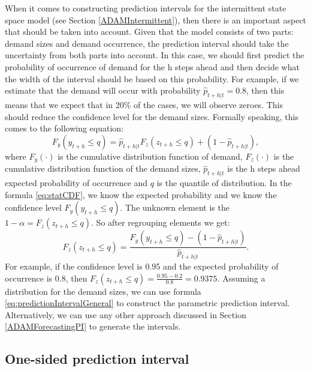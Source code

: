 \documentclass[
]{book}
\theoremstyle{definition}
\theoremstyle{definition}
\theoremstyle{definition}
\theoremstyle{definition}
\theoremstyle{remark}
\begin{document}
When it comes to constructing prediction intervals for the intermittent state space model (see Section \ref{ADAMIntermittent}), then there is an important aspect that should be taken into account. Given that the model consists of two parts: demand sizes and demand occurrence, the prediction interval should take the uncertainty from both parts into account. In this case, we should first predict the probability of occurrence of demand for the h steps ahead and then decide what the width of the interval should be based on this probability. For example, if we estimate that the demand will occur with probability \(\hat{p}_{t+h|t} = 0.8\), then this means that we expect that in 20\% of the cases, we will observe zeroes. This should reduce the confidence level for the demand sizes. Formally speaking, this comes to the following equation:
\begin{equation}
    F_y(y_{t+h} \leq q) = \hat{p}_{t+h|t} F_z(z_{t+h} \leq q) +(1 -\hat{p}_{t+h|t}),
    \label{eq:statCDF}
\end{equation}
where \(F_y(\cdot)\) is the cumulative distribution function of demand, \(F_z(\cdot)\) is the cumulative distribution function of the demand sizes, \(\hat{p}_{t+h|t}\) is the h steps ahead expected probability of occurrence and \(q\) is the quantile of distribution. In the formula \eqref{eq:statCDF}, we know the expected probability and we know the confidence level \(F_y(y_{t+h} \leq q)\). The unknown element is the \(1-\alpha = F_z(z_{t+h} \leq q)\). So after regrouping elements we get:
\begin{equation}
    F_z(z_{t+h} \leq q) = \frac{F_y(y_{t+h} \leq q) -(1 -\hat{p}_{t+h|t})}{\hat{p}_{t+h|t}}.
    \label{eq:statCDFDemandSizes}
\end{equation}
For example, if the confidence level is 0.95 and the expected probability of occurrence is 0.8, then \(F_z(z_{t+h} \leq q) = \frac{0.95 -0.2}{0.8} = 0.9375\). Assuming a distribution for the demand sizes, we can use formula \eqref{eq:predictionIntervalGeneral} to construct the parametric prediction interval. Alternatively, we can use any other approach discussed in Section \ref{ADAMForecastingPI} to generate the intervals.

\hypertarget{forecastingADAMOtherOneSided}{%
\subsection{One-sided prediction interval}\label{forecastingADAMOtherOneSided}}
\end{document}
